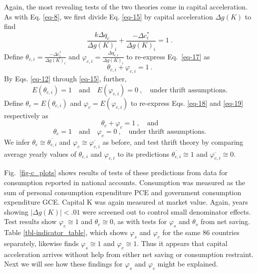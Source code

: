\documentclass[a4paper,fleqn]{latex_styles/cas-sc}
\begin{document}
%
Again, the most revealing tests of the two theories come in capital acceleration.
%
As with Eq. \eqref{eq-8}, we first divide Eq. \eqref{eq-15} by capital acceleration \(\Delta g(K)\) to find
%
\begin{equation}
\frac{k \Delta q_{c}}{ \Delta g(K)_{i}} + \frac{- \Delta c^{*}_{i}}{ \Delta g(K)_{i}} = 1\ .\label{eq-17}
\end{equation}
%
Define \(\theta_{c,i} = \frac{- \Delta c^{*}_{i}}{ \Delta g(K)_{i}}\)
and \(\varphi_{c,i} = \frac{ \Delta q_{c,i}}{ \Delta g(K)_{i}}\) to
re-express Eq.~\eqref{eq-17} as
%
\begin{equation}
\theta_{c,i} + \varphi_{c,i} = 1\ .\label{eq-18}
\end{equation}
%
By Eqs. \eqref{eq-12} through \eqref{eq-15}, further,
%
\begin{equation}
    E\left( \theta_{c,i} \right) = 1 \quad \text{and} \quad E\left( \varphi_{c,i} \right) = 0 \ , \quad \text{under thrift assumptions.}\label{eq-19}
\end{equation}
%
Define \(\theta_{c} = E\left( \theta_{c,i} \right)\) and
\(\varphi_{c} = E\left( \varphi_{c,i} \right)\) to re-express
Eqs. \eqref{eq-18} and \eqref{eq-19} respectively as
\begin{equation}
    \theta_c + \varphi_c = 1 \ , \quad \text{and}
    \label{eq-20}
\end{equation}
\vspace{-5ex}
\begin{equation}
    \theta_c = 1 \quad \text{and} \quad \varphi_c = 0 \ , \quad \text{under thrift assumptions.}
    \label{eq-21}
\end{equation}
We infer \(\theta_c \cong \overline{\theta_{c,i}}\) and \(\varphi_c \cong \overline{\varphi_{c,i}}\) as before, and test thrift theory by comparing average yearly values of $\theta_{c,i}$ and $\varphi_{c,i}$ to its predictions $\overline{\theta_{c,i}} \cong 1$ and $\overline{\varphi_{c,i}} \cong 0$.

Fig.~\ref{fig-c_plots} shows results of tests of these predictions from
data for consumption reported in national accounts. Consumption was
measured as the sum of personal consumption expenditure PCE and
government consumption expenditure GCE. Capital K was again measured at
market value. Again, years showing \(|\Delta g(K)| < .01\) were screened
out to control small denominator effects. Test results show
\(\varphi_{c} \cong 1\) and \(\theta_{c} \cong 0\), as with tests for
\(\varphi_{s}\) and \(\theta_{s}\) from net saving. Table \ref{tbl-indicator_table}, which shows $\varphi_s$ and $\varphi_{c}$ for the same 86 countries separately, likewise finds $\varphi_s \cong 1$ and $\varphi_c \cong 1$. Thus it appears
that capital acceleration arrives without help from either net
saving or consumption restraint. Next we will see how
these findings for \(\varphi_{s}\) and \(\varphi_{c}\) might be
explained.
  
\end{document}
